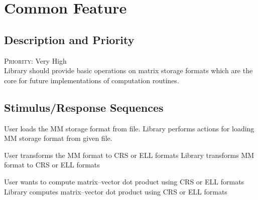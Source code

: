 \section{Common Feature} \label{s:system-features:common-feature}
	\begin{comment}
		$<$Don’t really say “System Feature 1.” State the feature name in just a few 
		words.$>$
	\end{comment}
	
\subsection*{Description and Priority}
	\begin{comment}
		$<$Provide a short description of the feature and indicate whether it is of 
		High, Medium, or Low priority. You could also include specific priority 
		component ratings, such as benefit, penalty, cost, and risk (each rated on a 
		relative scale from a low of 1 to a high of 9).$>$
	\end{comment}
	\textsc{Priority:} Very High \\
	Library should provide basic operations on matrix storage formats which are the core for future implementations of computation routines.
\subsection*{Stimulus/Response Sequences}
	\begin{comment}
		$<$List the sequences of user actions and system responses that stimulate the 
		behavior defined for this feature. These will correspond to the dialog elements 
		associated with use cases.$>$
	\end{comment}
	
	\stimresp
	{User loads the \gls{MM} storage format from file.}
	{Library performs actions for loading \gls{MM} storage format from given file.}
	
	\medskip
	
	\stimresp
	{User transforms the \gls{MM} format to \gls{CRS} or \gls{ELL} formats}
	{Library transforms \gls{MM} format to \gls{CRS} or \gls{ELL} formats}
	
	\medskip
	
	\stimresp
	{User wants to compute matrix--vector dot product using \gls{CRS} or \gls{ELL} formats}
	{Library computes matrix--vector dot product using \gls{CRS} or \gls{ELL} formats}
	
	\clearpage
